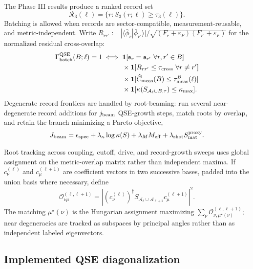 \documentclass[
  reprint,
  amsmath,
  amssymb,
  aps,
  pra,
  nofootinbib,
  superscriptaddress,
  floatfix
]{revtex4-2}
\newcommand{\Rset}{\mathcal{R}}
\newcommand{\Acal}{\mathcal{A}}
\newcommand{\qse}{\mathrm{QSE}}
\newcommand{\eps}{\varepsilon}
\newcommand{\braket}[2]{\langle #1|#2\rangle}
\begin{document}
The Phase III results produce a ranked record set
\begin{equation}
\Rset_3(\ell)=\{r:S_3(r;\ell)\ge\tau_3(\ell)\}.
\label{eq:qse_phase3_record_set}
\end{equation}
Batching is allowed when records are sector-compatible, measurement-reusable, and metric-independent.  Write
$R_{rr'}:=|\braket{\bar\phi_r}{\bar\phi_{r'}}|/
\sqrt{(F_r+\eps_F)(F_{r'}+\eps_F)}$ for the normalized residual cross-overlap:
\begin{equation}
\begin{aligned}
\Gamma_{\rm batch}^{\qse}(B;\ell)=1
\iff{}&
\mathbf 1[\mathfrak s_r=\mathfrak s_{r'}\ \forall r,r'\in B]
\\
&\times
\mathbf 1[
R_{rr'}\le\tau_{\rm cross}\ \forall r\ne r']
\\
&\times
\mathbf 1[\widehat C_{\rm meas}(B)\le \tau_{\rm meas}^{B}(\ell)]
\\
&\times
\mathbf 1[\kappa(S_{\Acal_\ell\cup B,\tau})\le\kappa_{\max}] .
\end{aligned}
\label{eq:qse_batch_gate}
\end{equation}
Degenerate record frontiers are handled by root-beaming: run several near-degenerate record additions for $j_{\rm beam}$ QSE-growth steps, match roots by overlap, and retain the branch minimizing a Pareto objective,
\begin{equation}
J_{\rm beam}
=
\epsilon_{\rm spec}
+\lambda_\kappa\log\kappa(S)
+\lambda_M M_{\rm eff}
+\lambda_{\rm shot}S_{\rm mat}^{\rm proxy}.
\label{eq:qse_beam_objective}
\end{equation}

Root tracking across coupling, cutoff, drive, and record-growth sweeps uses global assignment on the metric-overlap matrix rather than independent maxima.  If $c_\nu^{(\ell)}$ and $c_\mu^{(\ell+1)}$ are coefficient vectors in two successive bases, padded into the union basis where necessary, define
\begin{equation}
\mathcal O_{\nu\mu}^{(\ell,\ell+1)}
=
\left|
(c_\nu^{(\ell)})^\dagger
S_{\Acal_\ell\cup\Acal_{\ell+1}}
c_\mu^{(\ell+1)}
\right|^2 .
\label{eq:root_matching}
\end{equation}
The matching $\mu^\star(\nu)$ is the Hungarian assignment maximizing
$\sum_\nu \mathcal O_{\nu,\mu^\star(\nu)}^{(\ell,\ell+1)}$; near degeneracies are tracked as subspaces by principal angles rather than as independent labeled eigenvectors.

\subsection{Implemented QSE diagonalization}
\end{document}

